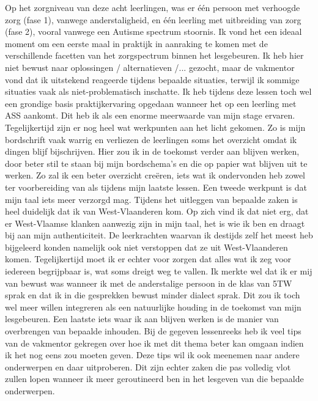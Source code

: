 \documentclass[a4paper,12pt,twoside]{article}%
\begin{document}
Op het zorgniveau van deze acht leerlingen, was er één persoon met verhoogde zorg (fase 1), vanwege anderstaligheid, en één leerling met uitbreiding van zorg (fase 2), vooral vanwege een Autisme spectrum stoornis. Ik vond het een ideaal moment om een eerste maal in praktijk in aanraking te komen met de verschillende facetten van het zorgspectrum binnen het lesgebeuren. Ik heb hier niet bewust naar oplossingen / alternatieven /... gezocht, maar de vakmentor vond dat ik uitstekend reageerde tijdens bepaalde situaties, terwijl ik sommige situaties vaak als niet-problematisch inschatte. Ik heb tijdens deze lessen toch wel een grondige basis praktijkervaring opgedaan wanneer het op een leerling met ASS aankomt. Dit heb ik als een enorme meerwaarde van mijn stage ervaren. \newline\newline
\newline
Tegelijkertijd zijn er nog heel wat werkpunten aan het licht gekomen. Zo is mijn bordschrift vaak warrig en verliezen de leerlingen soms het overzicht omdat ik dingen blijf bijschrijven. Hier zou ik in de toekomst verder aan blijven werken, door beter stil te staan bij mijn bordschema's en die op papier wat blijven uit te werken. Zo zal ik een beter overzicht creëren, iets wat ik ondervonden heb zowel ter voorbereiding van als tijdens mijn laatste lessen. Een tweede werkpunt is dat mijn taal iets meer verzorgd mag. Tijdens het uitleggen van bepaalde zaken is heel duidelijk dat ik van West-Vlaanderen kom. Op zich vind ik dat niet erg, dat er West-Vlaamse klanken aanwezig zijn in mijn taal, het is wie ik ben en draagt bij aan mijn authenticiteit. De leerkrachten waarvan ik destijds zelf het meest heb bijgeleerd konden namelijk ook niet verstoppen dat ze uit West-Vlaanderen komen. Tegelijkertijd moet ik er echter voor zorgen dat alles wat ik zeg voor iedereen begrijpbaar is, wat soms dreigt weg te vallen. Ik merkte wel dat ik er mij van bewust was wanneer ik met de anderstalige persoon in de klas van 5TW sprak en dat ik in die gesprekken bewust minder dialect sprak. Dit zou ik toch wel meer willen integreren als een natuurlijke houding in de toekomst van mijn lesgebeuren. \newline Een laatste iets waar ik aan blijven werken is de manier van overbrengen van bepaalde inhouden. Bij de gegeven lessenreeks heb ik veel tips van de vakmentor gekregen over hoe ik met dit thema beter kan omgaan indien ik het nog eens zou moeten geven. Deze tips wil ik ook meenemen naar andere onderwerpen en daar uitproberen. Dit zijn echter zaken die pas volledig vlot zullen lopen wanneer ik meer geroutineerd ben in het lesgeven van die bepaalde onderwerpen. \newline\newline
\end{document}
